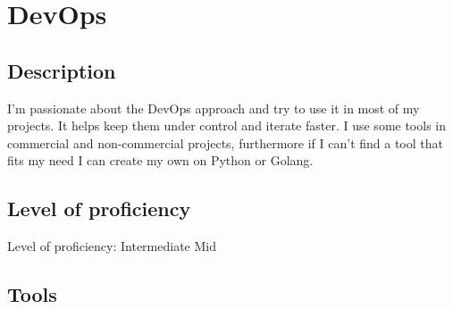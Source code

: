 \section{DevOps}

\subsection{Description}

I'm passionate about the DevOps approach and try to use it in most of my projects.
It helps keep them under control and iterate faster. I use some tools in commercial and
non-commercial projects, furthermore if I can't find a tool that fits my need I
can create my own on Python or Golang.

\subsection{Level of proficiency}

Level of proficiency: Intermediate Mid

\subsection{Tools}

